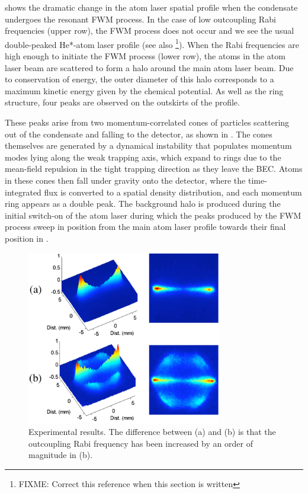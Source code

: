  shows the dramatic change in the atom laser spatial profile when the condensate undergoes the resonant FWM process. In the case of low outcoupling Rabi frequencies (upper row), the FWM process does not occur and we see the usual double-peaked He*-atom laser profile \citep{Dall:2007} (see also \footnote{FIXME: Correct this reference when this section is written}). When the Rabi frequencies are high enough to initiate the FWM process (lower row), the atoms in the atom laser beam are scattered to form a halo around the main atom laser beam. Due to conservation of energy, the outer diameter of this halo corresponds to a maximum kinetic energy given by the chemical potential. As well as the ring structure, four peaks are observed on the outskirts of the profile.

These peaks arise from two momentum-correlated cones of particles scattering out of the condensate and falling to the detector, as shown in . The cones themselves are generated by a dynamical instability that populates momentum modes lying along the weak trapping axis, which expand to rings due to the mean-field repulsion in the tight trapping direction as they leave the BEC. Atoms in these cones then fall under gravity onto the detector, where the time-integrated flux is converted to a spatial density distribution, and each momentum ring appears as a double peak. The background halo is produced during the initial switch-on of the atom laser during which the peaks produced by the FWM process sweep in position from the main atom laser profile towards their final position in .

\begin{figure}[htbp]
    \centering
        \includegraphics[height=3in]{ExperimentalResults}
    \caption{Experimental results. The difference between (a) and (b) is that the outcoupling Rabi frequency has been increased by an order of magnitude in (b).}
    \label{Peaks:ExperimentalResults}
\end{figure}

